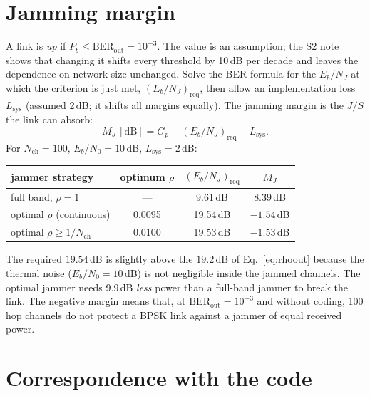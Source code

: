 \documentclass[11pt,a4paper]{article}
\newcommand{\EbNo}{E_b/N_0}
\newcommand{\EbNJ}{E_b/N_J}
\begin{document}
\section{Jamming margin}

A link is \emph{up} if $P_b \le \mathrm{BER}_{\mathrm{out}} = 10^{-3}$. The value is
an assumption; the S2 note shows that changing it shifts every threshold by
10\,dB per decade and leaves the dependence on network size unchanged.
Solve the BER formula for the $\EbNJ$ at which the criterion is just met,
$(\EbNJ)_{\mathrm{req}}$, then allow an implementation loss $L_{\mathrm{sys}}$
(assumed 2\,dB; it shifts all margins equally). The jamming margin is the $J/S$
the link can absorb:
\[
  M_J\,[\mathrm{dB}] = G_p - (\EbNJ)_{\mathrm{req}} - L_{\mathrm{sys}}.
\]
For $N_{\mathrm{ch}}=100$, $\EbNo=10$\,dB, $L_{\mathrm{sys}}=2$\,dB:

\begin{center}
\begin{tabular}{@{}lccc@{}}
\toprule
jammer strategy & optimum $\rho$ & $(\EbNJ)_{\mathrm{req}}$ & $M_J$ \\
\midrule
full band, $\rho=1$ & --- & 9.61\,dB & $\mathbf{8.39}$\,dB \\
optimal $\rho$ (continuous) & 0.0095 & 19.54\,dB & $\mathbf{-1.54}$\,dB \\
optimal $\rho\ge1/N_{\mathrm{ch}}$ & 0.0100 & 19.53\,dB & $\mathbf{-1.53}$\,dB \\
\bottomrule
\end{tabular}
\end{center}

The required $19.54$\,dB is slightly above the $19.2$\,dB of
Eq.~\eqref{eq:rhoout} because the thermal noise ($\EbNo=10$\,dB) is not
negligible inside the jammed channels.
The optimal jammer needs 9.9\,dB \emph{less} power than a full-band jammer to
break the link. The negative margin means that, at
$\mathrm{BER}_{\mathrm{out}}=10^{-3}$ and without coding, 100 hop channels do
not protect a BPSK link against a jammer of equal received power.

\section{Correspondence with the code}
\end{document}
